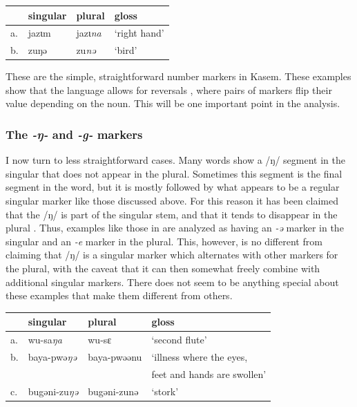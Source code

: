 \begin{exe}
    \ex \label{nepl-kasem}
    \begin{tabular}[t]{llll}
      & singular & plural & gloss        \\
      \midrule
      a. & jazɩm    & jazɩ\textit{na} & `right hand' \\
      b. & zuŋə     & zu\textit{nə}   & `bird'       \\
    \end{tabular}
\end{exe}

These are the simple, straightforward number markers in Kasem. These examples show that the language allows for reversals \autocite{Baerman.2007}, where pairs of markers flip their value depending on the noun. This will be one important point in the analysis.

\subsubsection{The \textit{-ŋ-} and \textit{-g-} markers}

I now turn to less straightforward cases. Many words show a /ŋ/ segment in the singular that does not appear in the plural. Sometimes this segment is the final segment in the word, but it is mostly followed by what appears to be a regular singular marker like those discussed above. For this reason it has been claimed that the /ŋ/ is part of the singular stem, and that it tends to disappear in the plural \autocites{Callow.1965, Awedoba.1980}. Thus, examples like those in   are analyzed as having an \textit{-ə} marker in the singular and an \textit{-e} marker in the plural. This, however, is no different from claiming that /ŋ/ is a singular marker which alternates with other markers for the plural, with the caveat that it can then somewhat freely combine with additional singular markers. There does not seem to be anything special about these examples that make them different from others.

\begin{exe}
    \ex \label{delete-ng}
    \begin{tabular}[t]{llll}
         & singular             & plural      & gloss                         \\
      \midrule
      a. & wu-sa\textit{ŋa}     & wu-sɛ       & `second flute'                \\
      b. & baya-pwə\textit{ŋə}  & baya-pwəənu & `illness where the eyes,       \\
         &                      &             &  feet and hands are swollen' \\
      c. & bugəni-zu\textit{ŋə} & bugəni-zunə & `stork'                       \\
    \end{tabular}
\end{exe}

